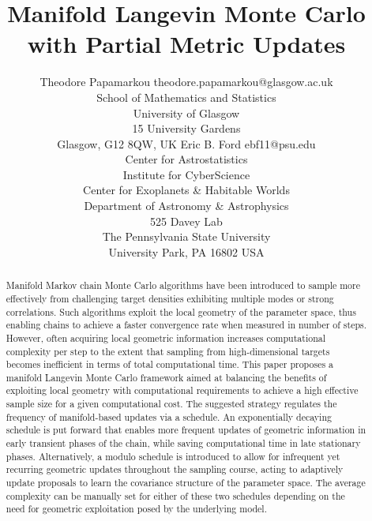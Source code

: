 \documentclass[twoside,11pt]{article}
\begin{document}
\title{Manifold Langevin Monte Carlo with Partial Metric Updates}

\author{
  \name Theodore Papamarkou
  \email theodore.papamarkou@glasgow.ac.uk\\
  \addr 
    School of Mathematics and Statistics\\
    University of Glasgow\\
    15 University Gardens\\
    Glasgow, G12 8QW, UK
\AND
  \name Eric B. Ford
  \email ebf11@psu.edu\\
  \addr
    Center for Astrostatistics\\
    Institute for CyberScience\\
    Center for Exoplanets \& Habitable Worlds\\
    Department of Astronomy \& Astrophysics\\
    525 Davey Lab\\
    The Pennsylvania State University\\
    University Park, PA 16802 USA
}


\maketitle

\begin{abstract}%
Manifold Markov chain Monte Carlo algorithms have been introduced to sample more effectively from challenging target 
densities exhibiting multiple modes or strong correlations. Such algorithms exploit the local geometry of the parameter 
space, thus enabling chains to achieve a faster convergence rate when measured in number of steps. However, often acquiring 
local geometric information increases computational complexity per step to the extent that sampling from high-dimensional 
targets becomes inefficient in terms of total computational time. This paper proposes a manifold Langevin Monte Carlo 
framework aimed at balancing the benefits of exploiting local geometry with computational requirements to achieve a high 
effective sample size for a given computational cost. The suggested strategy regulates the frequency of manifold-based 
updates via a schedule. An exponentially decaying schedule is put forward that enables more frequent updates of geometric 
information in early transient phases of the chain, while saving computational time in late stationary phases. 
Alternatively, a modulo schedule is introduced to allow for infrequent yet recurring geometric updates throughout the 
sampling course, acting to adaptively update proposals to learn the covariance structure of the parameter space. The average 
complexity can be manually set for either of these two schedules depending on the need for geometric exploitation posed by 
the underlying model.  
\end{abstract}
\end{document}
